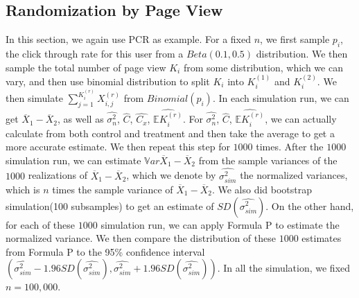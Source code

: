 \documentclass[10pt]{article}
\newcommand{\wht}{\widehat}
\newcommand{\var}{\ensuremath{\mathbb Var}}
\newcommand{\bbe}{\mathbb{E}}
\newcommand{\xbar}{\overline{X}}
\newcommand{\naiveest}{\wht{\sigma^2_n}}
\begin{document}
\subsection{Randomization by Page View}
In this section, we again use PCR as example. 
For a fixed $n$, we first sample $p_i$, the click through rate for this user from a $Beta(0.1,0.5)$ distribution. We then sample the total number of page view $K_i$ from some distribution, which we can vary, and then use binomial distribution to split $K_i$ into $K_i^{(1)}$ and $K_i^{(2)}$. We then simulate $\sum_{j=1}^{K_i^{(r)}}X_{i,j}^{(r)}$ from $Binomial(p_i)$. 
In each simulation run, we can get $\xbar_1-\xbar_2$, as well as  $\naiveest$, $\wht{C}$, $\wht{C_x}$, $\wht{\bbe K_i^{(r)}}$. For $\naiveest$, $\wht{C}$,  $\wht{\bbe K_i^{(r)}}$, we can actually calculate from both control and treatment and then take the average to get a more accurate estimate. We then repeat this step for $1000$ times. After the $1000$ simulation run, we can estimate $\var{\xbar_1-\xbar_2}$ from the sample variances of the $1000$ realizations of $\xbar_1-\xbar_2$, which we denote by $\wht{\sigma^2_{sim}}$ the normalized variances, which is $n$ times the sample variance of $\xbar_1-\xbar_2$. We also did bootstrap simulation(100 subsamples) to get an estimate of $SD(\wht{\sigma^2_{sim}})$. On the other hand, for each of these $1000$ simulation run, we can apply Formula P to estimate the normalized variance. We then compare the distribution of these $1000$ estimates from Formula P to the 95\% confidence interval $(\wht{\sigma^2_{sim}} - 1.96SD(\wht{\sigma^2_{sim}}), \wht{\sigma^2_{sim}} + 1.96SD(\wht{\sigma^2_{sim}}))$. In all the simulation, we fixed $n=100,000$.
\end{document}

